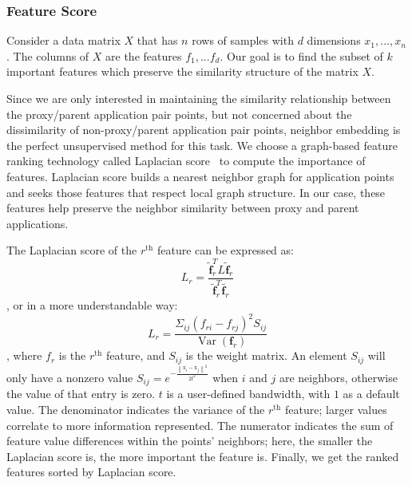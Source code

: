 \subsubsection{Feature Score}
\label{sec:feature_score}
Consider a data matrix $X$ that has $n$ rows of samples with $d$ dimensions $x_{1},...,x_{n}$. The columns of $X$ are the features $f_{1},...f_{d}$. Our goal is to find the subset of $k$ important features which preserve the similarity structure of the matrix $X$. 

Since we are only interested in maintaining the similarity relationship between the proxy/parent application pair points, but not concerned about the dissimilarity of non-proxy/parent application pair points, neighbor embedding is the perfect unsupervised method for this task. We choose a graph-based feature ranking technology called Laplacian score~\cite{he2005laplacian} to compute the importance of features.  Laplacian score builds a nearest neighbor graph for application points and seeks those features that respect local graph structure. In our case, these features help preserve the neighbor similarity between proxy and parent applications.  

The Laplacian score of the $r^\textrm{th}$ feature can be expressed as:
\begin{equation}L_{r}=\frac{\widetilde{\mathbf{f}}_{r}^{T} L \widetilde{\mathbf{f}}_{r}}{\widetilde{\mathbf{f}}_{r}^{T} \widetilde{\mathbf{f}_{r}}}
\end{equation}
, or in a more understandable way:
\begin{equation}
L_{r}=\frac{\Sigma_{i j}\left(f_{r i}-f_{r j}\right)^{2} S_{i j}}{\operatorname{Var}\left(\mathbf{f}_{r}\right)}
\end{equation} , where $f_r$ is the $r^\textrm{th}$ feature, and $S_{i j}$ is the weight matrix. An element $S_{i j}$ will only have a nonzero value $S_{i j}=e^{-\frac{\left\|\mathrm{x}_{i}-\mathrm{x}_{j}\right\|^{2}}{2t^{2}}}$ when $i$ and $j$ are neighbors, otherwise the value of that entry is zero. $t$ is a user-defined bandwidth, with $1$ as a default value. The denominator indicates the variance of the $r^\textrm{th}$ feature; larger values correlate to more information represented. The numerator indicates the sum of feature value differences within the points' neighbors; here, the smaller the Laplacian score is, the more important the feature is. Finally, we get the ranked features sorted by Laplacian score.

